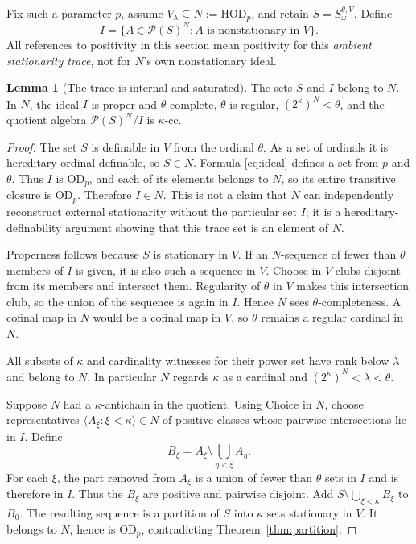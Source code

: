 \documentclass[11pt,letterpaper]{article}
\theoremstyle{definition}
\newtheorem{lemma}[definition]{Lemma}
\numberwithin{equation}{section}
\newcommand{\HOD}{\mathrm{HOD}}
\newcommand{\OD}{\mathrm{OD}}
\newcommand{\Pow}{\mathcal P}
\begin{document}
Fix such a parameter $p$, assume $V_\lambda\subseteq N:=\HOD_p$, and retain $S=S_\omega^{\theta,V}$. Define
\begin{equation}\label{eq:ideal}
I=\{A\in\Pow(S)^N:A\text{ is nonstationary in }V\}.
\end{equation}
All references to positivity in this section mean positivity for this \emph{ambient stationarity trace}, not for $N$'s own nonstationary ideal.

\begin{lemma}[The trace is internal and saturated]\label{lem:trace}
The sets $S$ and $I$ belong to $N$. In $N$, the ideal $I$ is proper and $\theta$-complete, $\theta$ is regular, $(2^\kappa)^N<\theta$, and the quotient algebra $\Pow(S)^N/I$ is $\kappa$-cc.
\end{lemma}

\begin{proof}
The set $S$ is definable in $V$ from the ordinal $\theta$. As a set of ordinals it is hereditary ordinal definable, so $S\in N$. Formula \eqref{eq:ideal} defines a set from $p$ and $\theta$. Thus $I$ is $\OD_p$, and each of its elements belongs to $N$, so its entire transitive closure is $\OD_p$. Therefore $I\in N$. This is not a claim that $N$ can independently reconstruct external stationarity without the particular set $I$; it is a hereditary-definability argument showing that this trace set is an element of $N$.

Properness follows because $S$ is stationary in $V$. If an $N$-sequence of fewer than $\theta$ members of $I$ is given, it is also such a sequence in $V$. Choose in $V$ clubs disjoint from its members and intersect them. Regularity of $\theta$ in $V$ makes this intersection club, so the union of the sequence is again in $I$. Hence $N$ sees $\theta$-completeness. A cofinal map in $N$ would be a cofinal map in $V$, so $\theta$ remains a regular cardinal in $N$.

All subsets of $\kappa$ and cardinality witnesses for their power set have rank below $\lambda$ and belong to $N$. In particular $N$ regards $\kappa$ as a cardinal and $(2^\kappa)^N<\lambda<\theta$.

Suppose $N$ had a $\kappa$-antichain in the quotient. Using Choice in $N$, choose representatives $\langle A_\xi:\xi<\kappa\rangle\in N$ of positive classes whose pairwise intersections lie in $I$. Define
\[
B_\xi=A_\xi\setminus\bigcup_{\eta<\xi}A_\eta.
\]
For each $\xi$, the part removed from $A_\xi$ is a union of fewer than $\theta$ sets in $I$ and is therefore in $I$. Thus the $B_\xi$ are positive and pairwise disjoint. Add $S\setminus\bigcup_{\xi<\kappa}B_\xi$ to $B_0$. The resulting sequence is a partition of $S$ into $\kappa$ sets stationary in $V$. It belongs to $N$, hence is $\OD_p$, contradicting Theorem~\ref{thm:partition}.
\end{proof}
\end{document}
